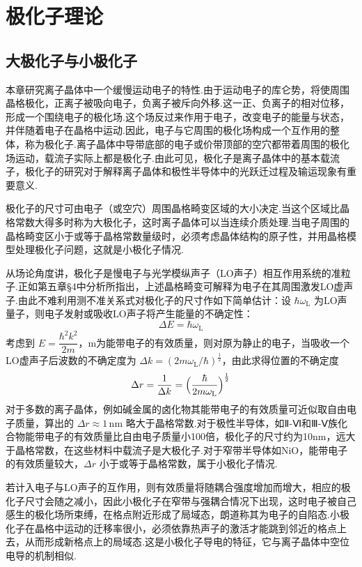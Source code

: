\chapter{极化子理论}

\section{大极化子与小极化子}

本章研究离子晶体中一个缓慢运动电子的特性.由于运动电子的库仑势，将使周围晶格极化，正离子被吸向电子，负离子被斥向外移.这一正、负离子的相对位移，形成一个围绕电子的极化场.这个场反过来作用于电子，改变电子的能量与状态，并伴随着电子在晶格中运动.因此，电子与它周围的极化场构成一个互作用的整体，称为极化子.离子晶体中导带底部的电子或价带顶部的空穴都带着周围的极化场运动，载流子实际上都是极化子.由此可见，极化子是离子晶体中的基本载流子，极化子的研究对于解释离子晶体和极性半导体中的光跃迁过程及输运现象有重要意义.

极化子的尺寸可由电子（或空穴）周围晶格畸变区域的大小决定.当这个区域比晶格常数大得多时称为大极化子，这时离子晶体可以当连续介质处理.当电子周围的晶格畸变区小于或等于晶格常数量级时，必须考虑晶体结构的原子性，并用晶格模型处理极化子问题，这就是小极化子情况.

从场论角度讲，极化子是慢电子与光学模纵声子（LO声子）相互作用系统的准粒子.正如第五章§4中分析所指出，上述晶格畸变可解释为电子在其周围激发LO虚声子.由此不难利用测不准关系式对极化子的尺寸作如下简单估计：设 $\hbar\omega_{\mathrm L}$ 为LO声量子，则电子发射或吸收LO声子将产生能量的不确定性：
\begin{equation}
  \Delta E=\hbar\omega_{\mathrm L}
\end{equation}
考虑到 $E=\dfrac{\hbar^{2}k^{2}}{2m}$，m为能带电子的有效质量，则对原为静止的电子，当吸收一个LO虚声子后波数的不确定度为 $\Delta k=(2m\omega_{\mathrm L}/\hbar)^{\frac{1}{2}}$，由此求得位置的不确定度
\begin{equation}
  \Delta r=\frac{1}{\Delta k}
  =\Bigl(\frac{\hbar}{2m\omega_{\mathrm L}}\Bigr)^{\frac{1}{2}}
\end{equation}
对于多数的离子晶体，例如碱金属的卤化物其能带电子的有效质量可近似取自由电子质量，算出的 $\Delta r\approx 1\,\mathrm{nm}$ 略大于晶格常数.对于极性半导体，如Ⅱ-Ⅵ和Ⅲ-Ⅴ族化合物能带电子的有效质量比自由电子质量小100倍，极化子的尺寸约为10nm，远大于晶格常数，在这些材料中载流子是大极化子.对于窄带半导体如NiO，能带电子的有效质量较大，$\Delta r$ 小于或等于晶格常数，属于小极化子情况.

若计入电子与LO声子的互作用，则有效质量将随耦合强度增加而增大，相应的极化子尺寸会随之减小，因此小极化子在窄带与强耦合情况下出现，这时电子被自己感生的极化场所束缚，在格点附近形成了局域态，朗道称其为电子的自陷态.小极化子在晶格中运动的迁移率很小，必须依靠热声子的激活才能跳到邻近的格点上去，从而形成新格点上的局域态.这是小极化子导电的特征，它与离子晶体中空位电导的机制相似.

